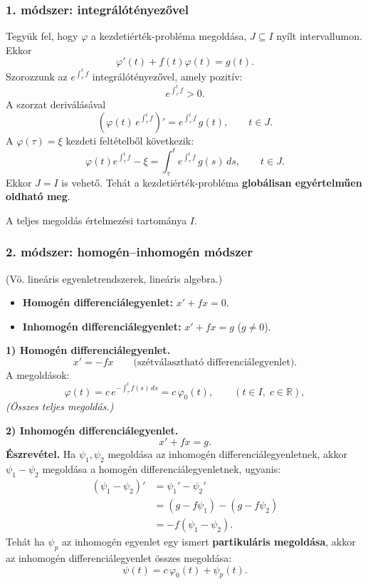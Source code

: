 \subsubsection*{1. módszer: integrálótényezővel}
Tegyük fel, hogy $\varphi$ a kezdetiérték-probléma megoldása,
$J\subseteq I$ nyílt intervallumon. Ekkor
\[
 \varphi'(t)+f(t)\varphi(t)=g(t).
\]
Szorozzunk az $\displaystyle e^{\int_\tau^t f}$
integrálótényezővel, amely pozitív:
\[
 e^{\int_\tau^t f}>0.
\]
A szorzat deriválásával
\[
 \left(\varphi(t)\,e^{\int_\tau^t f}\right)'
 =e^{\int_\tau^t f}\,g(t),\qquad t\in J.
\]
A $\varphi(\tau)=\xi$ kezdeti feltételből következik:
\[
 \varphi(t)e^{\int_\tau^t f}-\xi
 =\int_\tau^t e^{\int_\tau^t f}\,g(s)\,ds,
 \qquad t\in J.
\]
Ekkor $J=I$ is vehető. Tehát a kezdetiérték-probléma
\textbf{globálisan egyértelműen oldható meg}.

A teljes megoldás értelmezési tartománya $I$.

\subsubsection*{2. módszer: homogén--inhomogén módszer}
(Vö. lineáris egyenletrendszerek, lineáris algebra.)

\begin{itemize}
 \item \textbf{Homogén differenciálegyenlet:} $x'+fx=0$.
 \item \textbf{Inhomogén differenciálegyenlet:} $x'+fx=g$
       \quad($g\ne0$).
\end{itemize}

\textbf{1) Homogén differenciálegyenlet.}
\[
 x'=-fx\qquad\text{(szétválasztható differenciálegyenlet).}
\]
A megoldások:
\[
 \varphi(t)
 =c\,e^{-\int_\tau^t f(s)\,ds}
 =c\,\varphi_0(t),
 \qquad (t\in I,\;c\in\mathbb R),
\]
\textit{(Összes teljes megoldás.)}

\textbf{2) Inhomogén differenciálegyenlet.}
\[
 x'+fx=g.
\]
\textbf{Észrevétel.}
Ha $\psi_1,\psi_2$ megoldása az inhomogén
differenciálegyenletnek, akkor $\psi_1-\psi_2$ megoldása a homogén
differenciálegyenletnek, ugyanis:
\begin{align*}
 (\psi_1-\psi_2)'
 &=\psi_1'-\psi_2'\\
 &=(g-f\psi_1)-(g-f\psi_2)\\
 &=-f(\psi_1-\psi_2).
\end{align*}
Tehát ha $\psi_p$ az inhomogén egyenlet egy ismert
\textbf{partikuláris megoldása}, akkor az inhomogén differenciálegyenlet
összes megoldása:
\[
 \psi(t)=c\,\varphi_0(t)+\psi_p(t).
\]

